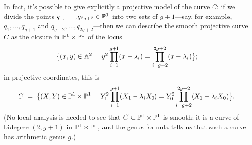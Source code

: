   In fact, it's possible to give explicitly a projective model of the curve $C$: if we divide the points $q_1,\dots,q_{2g+2} \in \PP^1$ into two sets of $g+1$---say, for example, $q_1,\dots,q_{g+1}$ and $q_{g+2}, \dots, q_{2g+2}$---then we can describe the smooth projective curve $C$ as the closure in $\PP^1 \times \PP^1$ of the  locus
  $$
  \big\{ (x,y) \in \AA^2 \; \mid \; y^2\prod_{i=1}^{g+1} (x - \lambda_i) = \prod_{i=g+2}^{2g+2} (x - \lambda_i) \big\};
  $$
  in projective coordinates, this is
   $$
  C \; = \; \big\{ (X,Y) \in \PP^1 \times \PP^1 \; \mid \; Y_1^2\prod_{i=1}^{g+1} (X_1 - \lambda_iX_0) = Y_0^2\prod_{i=g+2}^{2g+2} (X_1 - \lambda_iX_0) \big\}.
  $$
  (No local analysis is needed to see that $C \subset \PP^1 \times \PP^1$ is smooth: it is a curve of bidegree $(2,g+1)$ in $\PP^1 \times \PP^1$, and the genus formula tells us that such a curve has arithmetic genus $g$.)
  
%  
%  
%  
% 
%
%

